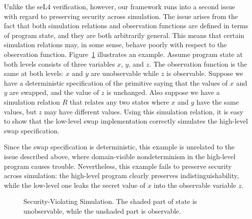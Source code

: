 Unlike the seL4 verification, however, our framework runs into a
second issue with regard to preserving security across simulation.
The issue arises from the fact that both simulation relations
and observation functions are defined in terms of program state,
and they are both arbitrarily general.
This means that certain simulation relations may, in some sense,
behave poorly with respect to the observation function.
Figure~\ref{paradox} illustrates an example. Assume 
program state at both levels consists of three variables
$x$, $y$, and $z$. 
The observation function is the same at both levels: $x$ and $y$
are unobservable while $z$ is observable. Suppose we have a
deterministic specification of the  primitive
saying that the values of $x$ and $y$ are swapped, and
the value of $z$ is unchanged. Also suppose we have a simulation 
relation $R$ that relates any two states where $x$ and $y$ have 
the same values, but $z$ may have different values.
Using this simulation relation, it is easy to show that the
low-level swap implementation correctly simulates the high-level 
swap specification.

Since the swap specification is deterministic,
this example is unrelated to the issue described above,
where domain-visible nondeterminism in the high-level program
causes trouble. 
Nevertheless, this example fails to preserve security across
simulation: the high-level program clearly preserves 
indistinguishability, while the low-level one leaks the secret 
value of $x$ into the observable variable $z$.

\begin{figure}
\caption{\small{Security-Violating Simulation. The shaded
part of state is unobservable, while the unshaded part is observable.}}
\label{paradox}
\end{figure}

